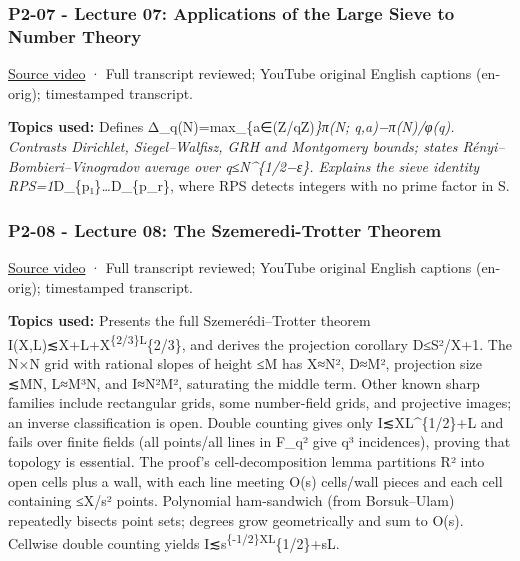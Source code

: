 \subsubsection{P2-07 - Lecture 07: Applications of the Large Sieve to Number Theory}\label{04-visual-computing-ii-ch036-p2-07---lecture-07-applications-of-the-large-sieve-to-number-theory}

\hypertarget{04-visual-computing-ii-ch036-p2-07---lecture-07-applications-of-the-large-sieve-to-number-theory}{}

\href{https://www.youtube.com/watch?v=-UJgxLaFzfM}{Source video} · Full transcript reviewed; YouTube original English captions (en-orig); timestamped transcript.

\textbf{Topics used:} Defines Δ\_q(N)=max\_\{a∈(Z/qZ)\emph{\}\textbar π(N; q,a)−π(N)/φ(q)\textbar. Contrasts Dirichlet, Siegel--Walfisz, GRH and Montgomery bounds; states Rényi--Bombieri--Vinogradov average over q≤N\^{}\{1/2−ε\}. Explains the sieve identity RPS=1}D\_\{p₁\}\emph{\ldots{}}D\_\{p\_r\}, where RPS detects integers with no prime factor in S.

\subsubsection{P2-08 - Lecture 08: The Szemeredi-Trotter Theorem}\label{04-visual-computing-ii-ch036-p2-08---lecture-08-the-szemeredi-trotter-theorem}

\hypertarget{04-visual-computing-ii-ch036-p2-08---lecture-08-the-szemeredi-trotter-theorem}{}

\href{https://www.youtube.com/watch?v=3h0jvsOnTIc}{Source video} · Full transcript reviewed; YouTube original English captions (en-orig); timestamped transcript.

\textbf{Topics used:} Presents the full Szemerédi--Trotter theorem I(X,L)≲\textbar X\textbar+\textbar L\textbar+\textbar X\textbar{}\textsuperscript{\{2/3\}\textbar L\textbar{}}\{2/3\}, and derives the projection corollary \textbar D\textbar≤S²/\textbar X\textbar+1. The N×N grid with rational slopes of height ≤M has \textbar X\textbar≈N², \textbar D\textbar≈M², projection size ≲MN, \textbar L\textbar≈M³N, and I≈N²M², saturating the middle term. Other known sharp families include rectangular grids, some number-field grids, and projective images; an inverse classification is open. Double counting gives only I≲\textbar X\textbar\textbar L\textbar\^{}\{1/2\}+\textbar L\textbar{} and fails over finite fields (all points/all lines in F\_q² give q³ incidences), proving that topology is essential. The proof's cell-decomposition lemma partitions R² into open cells plus a wall, with each line meeting O(s) cells/wall pieces and each cell containing ≤\textbar X\textbar/s² points. Polynomial ham-sandwich (from Borsuk--Ulam) repeatedly bisects point sets; degrees grow geometrically and sum to O(s). Cellwise double counting yields I≲s\textsuperscript{\{-1/2\}\textbar X\textbar\textbar L\textbar{}}\{1/2\}+s\textbar L\textbar.

